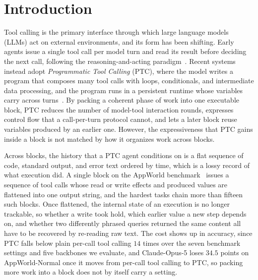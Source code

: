 \section{Introduction}
\label{sec:intro}

Tool calling is the primary interface through which large language models (LLMs) act on external environments, and its form has been shifting.
Early agents issue a single tool call per model turn and read its result before deciding the next call, following the reasoning-and-acting paradigm~\citep{yao2023react,schick2023toolformer,qin2024toolllm}.
Recent systems instead adopt \emph{Programmatic Tool Calling} (PTC), where the model writes a program that composes many tool calls with loops, conditionals, and intermediate data processing, and the program runs in a persistent runtime whose variables carry across turns~\citep{gao2023pal,wang2024codeact,smolagents2025,anthropic2025ptc}.
By packing a coherent phase of work into one executable block, PTC reduces the number of model-tool interaction rounds, expresses control flow that a call-per-turn protocol cannot, and lets a later block reuse variables produced by an earlier one.
However, the expressiveness that PTC gains inside a block is not matched by how it organizes work across blocks.

Across blocks, the history that a PTC agent conditions on is a flat sequence of code, standard output, and error text ordered by time, which is a lossy record of what execution did.
A single block on the AppWorld benchmark~\citep{trivedi2024appworld} issues a sequence of tool calls whose read or write effects and produced values are flattened into one output string, and the hardest tasks chain more than fifteen such blocks.
Once flattened, the internal state of an execution is no longer trackable, so whether a write took hold, which earlier value a new step depends on, and whether two differently phrased queries returned the same content all have to be recovered by re-reading raw text.
The cost shows up in accuracy, since PTC falls below plain per-call tool calling $14$ times over the seven benchmark settings and five backbones we evaluate, and Claude-Opus-5 loses $34.5$ points on AppWorld-Normal once it moves from per-call tool calling to PTC, so packing more work into a block does not by itself carry a setting.



